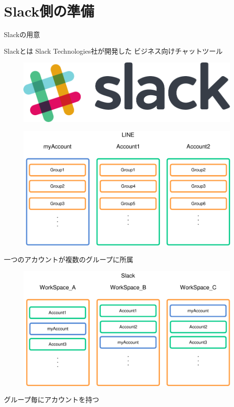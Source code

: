 \documentclass[dvipdfmx,xcolor={svgnames},aspectratio=169]{beamer}
\begin{document}
  \section{Slack側の準備}
  \begin{frame}{Slackの用意}
    \begin{block}{Slackとは}
      Slack Technologies社が開発した
      ビジネス向けチャットツール
    \end{block}
    \begin{figure}\centering
      \includegraphics[width=\hsize]{slack_cmyk.pdf}
    \end{figure}
  \end{frame}
  \begin{frame}
    \begin{figure}\centering
      \includegraphics[scale=0.6]{LINE_image_figure.pdf}
    \end{figure}
    \pause\huge 一つのアカウントが複数のグループに所属
  \end{frame}
  \begin{frame}
    \begin{figure}\centering
      \includegraphics[scale=0.6]{Slack_image_figure.pdf}
    \end{figure}
    \pause\huge グループ毎にアカウントを持つ
  \end{frame}
\end{document}
